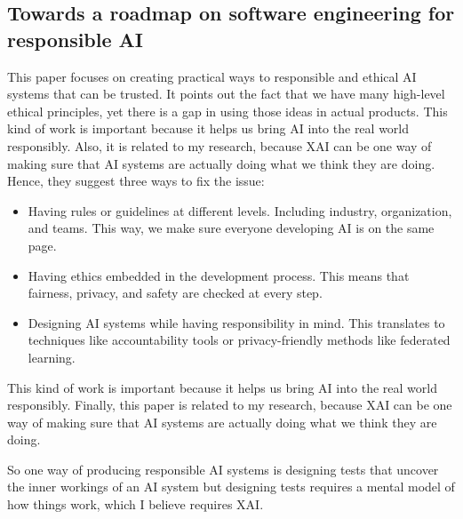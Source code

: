 \subsection{Towards a roadmap on software engineering for responsible AI \cite{pp2}}
This paper focuses on creating practical ways to responsible and ethical AI systems that can be trusted. 
It points out the fact that we have many high-level ethical principles, yet there is a gap in using those ideas in actual products. 
This kind of work is important because it helps us bring AI into the real world responsibly. 
Also, it is related to my research, because XAI can be one way of making sure that AI systems are actually doing what we think they are doing.
Hence, they suggest three ways to fix the issue:
\begin{itemize}
    \item Having rules or guidelines at different levels. Including industry, organization, and teams. This way, we make sure everyone developing AI is on the same page.
    \item Having ethics embedded in the development process. This means that fairness, privacy, and safety are checked at every step.
    \item Designing AI systems while having responsibility in mind. 
    This translates to techniques like accountability tools or privacy-friendly methods like federated learning.
\end{itemize}
    
This kind of work is important because it helps us bring AI into the real world responsibly. 
Finally, this paper is related to my research, because XAI can be one way of making sure that AI systems are actually doing what we think they are doing.

So one way of producing responsible AI systems is designing tests that uncover the inner workings of an AI system but designing tests requires a mental model of how things work, which I believe requires XAI.